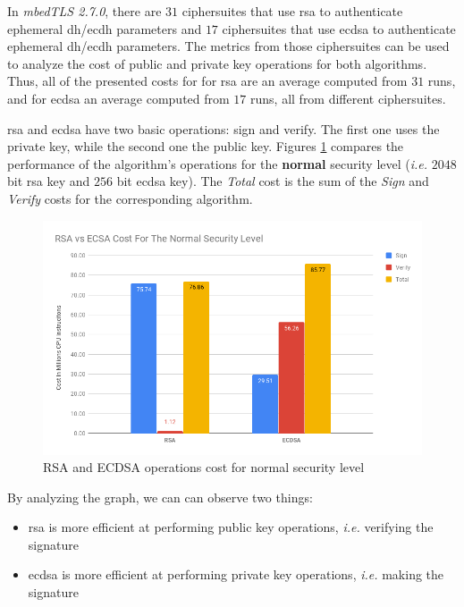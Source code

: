 \documentclass{llncs}
\begin{document}
In \textit{mbedTLS 2.7.0}, there are $31$ ciphersuites that use \gls{rsa} to authenticate ephemeral \gls{dh}/\gls{ecdh} parameters 
and $17$ ciphersuites that use \gls{ecdsa} to authenticate ephemeral \gls{dh}/\gls{ecdh} parameters. The metrics from those
ciphersuites can be used to analyze the cost of public and private key operations for both algorithms. Thus, all of the presented
costs for for \gls{rsa} are an average computed from $31$ runs, and for \gls{ecdsa} an average computed from $17$ runs, all from
different ciphersuites.

\gls{rsa} and \gls{ecdsa} have two basic operations: sign and verify. The first one uses the private key, while the
second one the public key. Figures \ref{fig:rsa-ecdsa-sign-ver-total-normal-sl} compares the performance of the algorithm's
operations for the \textbf{normal} security level (\textit{i.e.} $2048$ bit \gls{rsa} key and $256$ bit \gls{ecdsa} key).
The \textit{Total} cost is the sum of the \textit{Sign} and \textit{Verify} costs for the corresponding algorithm.

\begin{figure}
  \centering
  \includegraphics[width=1.0\textwidth]{img/rsa_ecdsa_cost_normal_sl.png}
  \centering \caption{\label{fig:rsa-ecdsa-sign-ver-total-normal-sl} RSA and ECDSA operations cost for normal security level}
\end{figure}

By analyzing the graph, we can can observe two things:

\begin{itemize}
  \item \gls{rsa} is more efficient at performing public key operations, \textit{i.e.} verifying the signature
  \item \gls{ecdsa} is more efficient at performing private key operations, \textit{i.e.} making the signature
\end{itemize}
\end{document}
